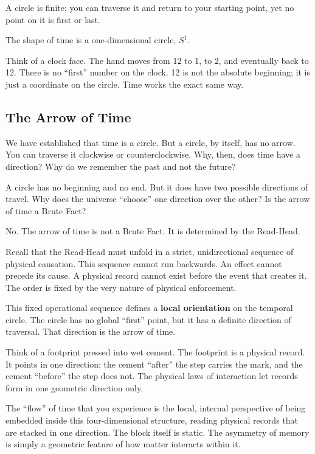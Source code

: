 \documentclass[11pt]{article}
\theoremstyle{canonstyle}
\providecommand{\Sone}{S^1}
\begin{document}
A circle is finite; you can traverse it and return to your starting point, yet no point on it is first or last.

\begin{keyresult}
The shape of time is a one-dimensional circle, $\Sone$.
\end{keyresult}

Think of a clock face. The hand moves from 12 to 1, to 2, and eventually back to 12. There is no ``first'' number on the clock. 12 is not the absolute beginning; it is just a coordinate on the circle. Time works the exact same way.

\subsection{The Arrow of Time}

We have established that time is a circle. But a circle, by itself, has no arrow. You can traverse it clockwise or counterclockwise. Why, then, does time have a direction? Why do we remember the past and not the future?

\begin{reflect}
A circle has no beginning and no end. But it does have two possible directions of travel. Why does the universe ``choose'' one direction over the other? Is the arrow of time a Brute Fact?
\end{reflect}

No. The arrow of time is not a Brute Fact. It is determined by the Read-Head.

Recall that the Read-Head must unfold in a strict, unidirectional sequence of physical causation. This sequence cannot run backwards. An effect cannot precede its cause. A physical record cannot exist before the event that creates it. The order is fixed by the very nature of physical enforcement.

This fixed operational sequence defines a \textbf{local orientation} on the temporal circle. The circle has no global ``first'' point, but it has a definite direction of traversal. That direction is the arrow of time.

Think of a footprint pressed into wet cement. The footprint is a physical record. It points in one direction: the cement ``after'' the step carries the mark, and the cement ``before'' the step does not. The physical laws of interaction let records form in one geometric direction only. 

The ``flow'' of time that you experience is the local, internal perspective of being embedded inside this four-dimensional structure, reading physical records that are stacked in one direction. The block itself is static. The asymmetry of memory is simply a geometric feature of how matter interacts within it.
\end{document}
